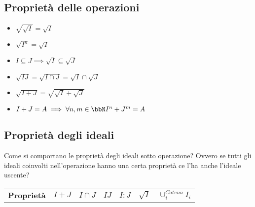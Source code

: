 \documentclass[a4paper,GeneralMath,NoNotes]{stdmdoc}
\begin{document}
	\subsection{Proprietà delle operazioni}
	\begin{itemize}
		\item $\sqrt{\sqrt{I}} = \sqrt{I}$
		\item $\sqrt{I^n} = \sqrt{I}$
		\item $I \subseteq J \implies \sqrt{I} \subseteq \sqrt{J}$
		\item $\sqrt{IJ} = \sqrt{I \cap J} = \sqrt{I} \cap \sqrt{J}$
		\item $\sqrt{I + J} = \sqrt{\sqrt{I} + \sqrt{J}}$
		\item $I + J = A \implies \forall n, m \in \bbN I^n + J^m = A$
	\end{itemize}

	\subsection{Proprietà degli ideali}
	Come si comportano le proprietà degli ideali sotto operazione? Ovvero se tutti gli ideali coinvolti nell'operazione hanno una certa proprietà ce l'ha anche l'ideale uscente?
	\vskip 0.3cm \begin{tabular}{lcccccc}
	{\bf Proprietà} & {\bf $I + J$} & {\bf $I \cap J$} & {\bf $IJ$} & {\bf $I:J$} & {\bf $\sqrt{I}$} & {\bf $\cup_i^{Catena} I_i$} \\
	\end{tabular} \vskip 0.3cm
\end{document}
